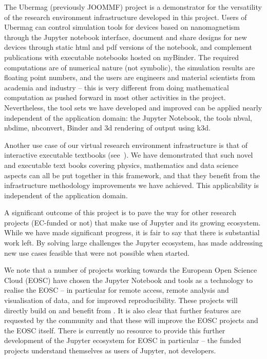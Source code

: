 \begin{compactenum}[\bf {Obj} 1\rm]
  The Ubermag (previously JOOMMF) project is a demonstrator for the
  versatility of the research environment infrastructure developed in
  this project.  Users of Ubermag can control simulation tools for
  devices based on nanomagnetism through the Jupyter notebook
  interface, document and share designs for new devices through static
  html and pdf versions of the notebook, and complement publications
  with executable notebooks hosted on myBinder. The required
  computations are of numerical nature (not symbolic), the simulation
  results are floating point numbers, and the users are engineers and
  material scientists from academia and industry -- this is very
  different from doing mathematical computation as pushed forward in
  most other activities in the project. Nevertheless, the tool sets we
  have developed and improved can be applied nearly independent of the application
  domain: the Jupyter Notebook, the tools nbval, nbdime, nbconvert,
  Binder and 3d rendering of output using k3d.

  Another use case of our virtual research environment infrastructure
  is that of interactive executable textbooks (see~).
  We have demonstrated
  that such novel and executable text books covering physics,
  mathematics and data science aspects can all be put together in this
  framework, and that they benefit from the infrastructure methodology
  improvements we have achieved. This applicability is independent of
  the application domain.

  A significant outcome of this project is to pave the way for
  other research projects (EC-funded or not) that make use of Jupyter
  and its growing ecosystem. While we have made significant progress,
  it is fair to say that there is substantial work left.
  By solving large challenges the Jupyter ecosystem,
  \ODK has made addressing new use cases feasible
  that were not possible when \ODK started.

  We note that a number of projects working towards the European Open
  Science Cloud (EOSC) have chosen the Jupyter Notebook and tools as a
  technology to realise the EOSC -- in particular for remote access,
  remote analysis and visualisation of data, and for improved
  reproducibility. These projects will directly build on and benefit
  from \ODK.  It is also clear that further features are
  requested by the community and that these will improve the EOSC
  projects and the EOSC itself.  There is currently no resource to
  provide this further development of the Jupyter ecosystem for EOSC in particular -- the funded projects understand themselves
  as users of Jupyter, not developers.



\end{compactenum}
